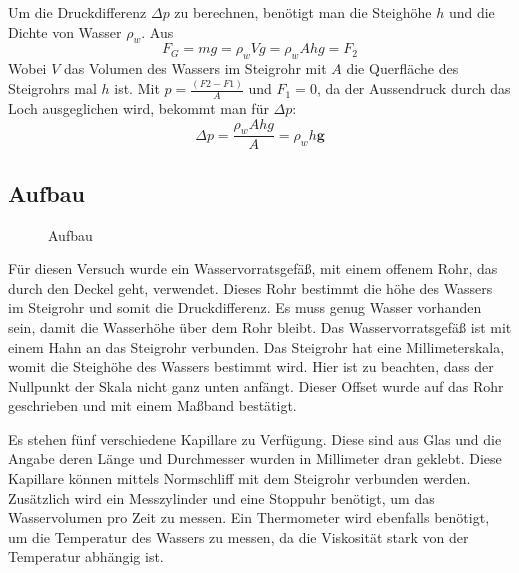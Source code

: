 \documentclass[11pt,a4paper]{article}
\renewcommand{\vec}{\boldsymbol}
\begin{document}
Um die Druckdifferenz $\Delta p$ zu berechnen, benötigt man die Steighöhe $h$ und die Dichte von Wasser $\rho_w$.
Aus
$$F_G = mg = \rho_w Vg = \rho_w Ahg = F_2$$
Wobei $V$ das Volumen des Wassers im Steigrohr mit $A$ die Querfläche des Steigrohrs mal $h$ ist.
Mit $p = \frac{(F2-F1)}{A}$ und $F_1 = 0$, da der Aussendruck durch das Loch ausgeglichen wird, bekommt man für $\Delta p$:
$$\Delta p = \frac{\rho_w Ahg}{A} = \rho_w h \vec{g}$$

\pagebreak

\subsection{Aufbau}

\begin{figure}[ht]
\centering
{}
   \renewcommand\thefigure{B1}
\caption[Aufbau]{Aufbau \cite{Anleitung}}
\label{Pic:1}
\end{figure}

Für diesen Versuch wurde ein Wasservorratsgefäß, mit einem offenem Rohr, das durch den Deckel geht, verwendet. Dieses Rohr bestimmt die höhe des Wassers im Steigrohr und somit die Druckdifferenz. Es muss genug Wasser vorhanden sein, damit die Wasserhöhe über dem Rohr bleibt. Das Wasservorratsgefäß ist mit einem Hahn an das Steigrohr verbunden. Das Steigrohr hat eine Millimeterskala, womit die Steighöhe des Wassers bestimmt wird. Hier ist zu beachten, dass der Nullpunkt der Skala nicht ganz unten anfängt. Dieser Offset wurde auf das Rohr geschrieben und mit einem Maßband bestätigt. 

Es stehen fünf verschiedene Kapillare zu Verfügung. Diese sind aus Glas und die Angabe deren Länge und Durchmesser wurden in Millimeter dran geklebt. Diese Kapillare können mittels Normschliff mit dem Steigrohr verbunden werden. Zusätzlich wird ein Messzylinder und eine Stoppuhr benötigt, um das Wasservolumen pro Zeit zu messen. Ein Thermometer wird ebenfalls benötigt, um die Temperatur des Wassers zu messen, da die Viskosität stark von der Temperatur abhängig ist.
\end{document}
